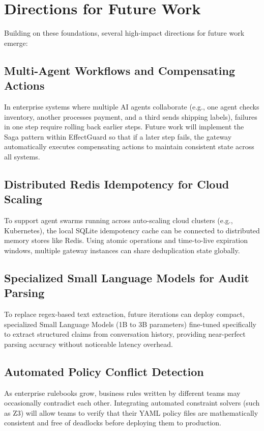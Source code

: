 \section{Directions for Future Work}

Building on these foundations, several high-impact directions for future work emerge:

\subsection{Multi-Agent Workflows and Compensating Actions}
In enterprise systems where multiple AI agents collaborate (e.g., one agent checks inventory, another processes payment, and a third sends shipping labels), failures in one step require rolling back earlier steps. Future work will implement the Saga pattern \cite{garciamolina1987sagas} within EffectGuard so that if a later step fails, the gateway automatically executes compensating actions to maintain consistent state across all systems.

\subsection{Distributed Redis Idempotency for Cloud Scaling}
To support agent swarms running across auto-scaling cloud clusters (e.g., Kubernetes), the local SQLite idempotency cache can be connected to distributed memory stores like Redis. Using atomic operations and time-to-live expiration windows, multiple gateway instances can share deduplication state globally.

\subsection{Specialized Small Language Models for Audit Parsing}
To replace regex-based text extraction, future iterations can deploy compact, specialized Small Language Models (1B to 3B parameters) fine-tuned specifically to extract structured claims from conversation history, providing near-perfect parsing accuracy without noticeable latency overhead.

\subsection{Automated Policy Conflict Detection}
As enterprise rulebooks grow, business rules written by different teams may occasionally contradict each other. Integrating automated constraint solvers (such as Z3) will allow teams to verify that their YAML policy files are mathematically consistent and free of deadlocks before deploying them to production.

